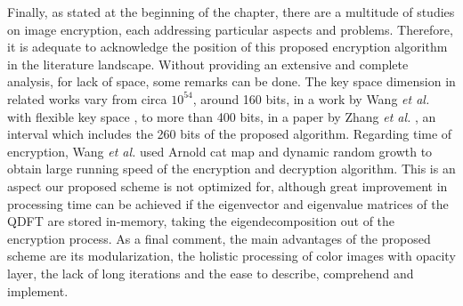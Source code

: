 \begin{figure}[htbp]
\end{figure}

Finally, as stated at the beginning of the chapter, there are a multitude of studies on image encryption, each addressing particular aspects and problems. Therefore, it is adequate to acknowledge the position of this proposed encryption algorithm in the literature landscape. Without providing an extensive and complete analysis, for lack of space, some remarks can be done. The key space dimension in related works vary from circa $ 10^{54} $, around 160 bits, in a work by Wang \textit{et al.} with flexible key space \cite{wang2015novel}, to more than 400 bits, in a paper by Zhang \textit{et al.} \cite{zhang2015new}, an interval which includes the 260 bits of the proposed algorithm. Regarding time of encryption, Wang \textit{et al.} \cite{wang2015novelchaotic} used Arnold cat map and dynamic random growth to obtain large running speed of the encryption and decryption algorithm. This is an aspect our proposed scheme is not optimized for, although great improvement in processing time can be achieved if the eigenvector and eigenvalue matrices of the QDFT are stored in-memory, taking the eigendecomposition out of the encryption process. As a final comment, the main advantages of the proposed scheme are its modularization, the holistic processing of color images with opacity layer, the lack of long iterations and the ease to describe, comprehend and implement.


